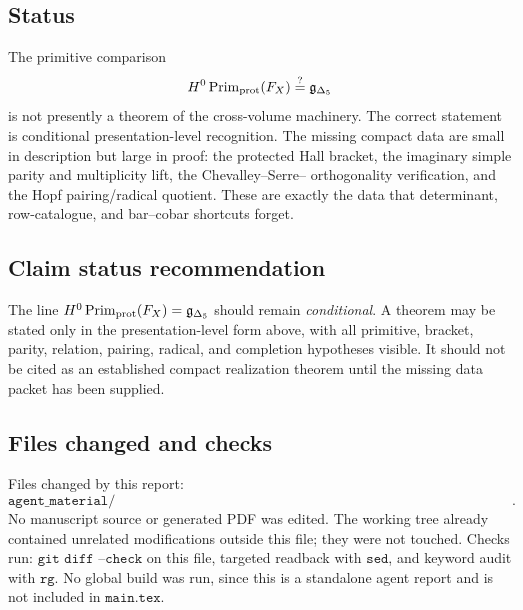 \subsection{Status}

The primitive comparison
\[
   H^0\operatorname{Prim}_{\mathrm{prot}}(F_X)\stackrel{?}{=}\mathfrak g_{\Delta_{5}}
\]
is not presently a theorem of the cross-volume machinery.  The correct
statement is conditional presentation-level recognition.  The missing compact
data are small in description but large in proof: the protected Hall bracket,
the imaginary simple parity and multiplicity lift, the Chevalley--Serre--
orthogonality verification, and the Hopf pairing/radical quotient.  These are
exactly the data that determinant, row-catalogue, and bar--cobar shortcuts
forget.

\subsection{Claim status recommendation}

The line \(H^0\operatorname{Prim}_{\mathrm{prot}}(F_X)=\mathfrak g_{\Delta_{5}}\) should remain
\emph{conditional}.  A theorem may be stated only in the presentation-level
form above, with all primitive, bracket, parity, relation, pairing, radical,
and completion hypotheses visible.  It should not be cited as an established
compact realization theorem until the missing data packet has been supplied.

\subsection{Files changed and checks}

Files changed by this report:
\[
   \texttt{agent\_material/14\_primitive\_borcherds\_recognition\_from\_volumes\_attack\_heal.tex}.
\]
No manuscript source or generated PDF was edited.  The working tree already
contained unrelated modifications outside this file; they were not touched.
Checks run: \(\texttt{git diff --check}\) on this file, targeted readback with
\(\texttt{sed}\), and keyword audit with \(\texttt{rg}\).  No global build was
run, since this is a standalone agent report and is not included in
\(\texttt{main.tex}\).
